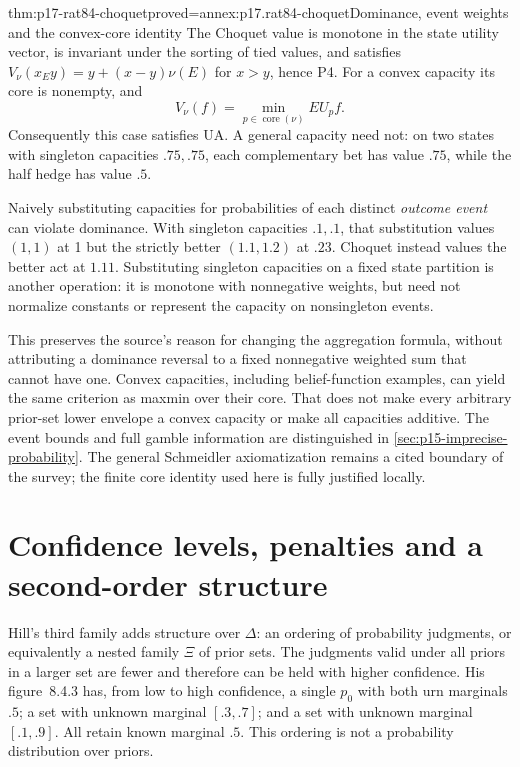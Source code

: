 \begin{hbtheorem}{thm:p17-rat84-choquet}{proved=annex:p17.rat84-choquet}{Dominance, event weights and the convex-core identity}
The Choquet value is monotone in the state utility vector, is invariant
under the sorting of tied values, and satisfies
\(V_\nu(x_Ey)=y+(x-y)\nu(E)\) for \(x>y\), hence P4.
For a convex capacity its core is nonempty, and
\[
              V_\nu(f)=\min_{p\in\operatorname{core}(\nu)}EU_p f.
\]
Consequently this case satisfies UA. A general capacity need not:
on two states with singleton capacities \(.75,.75\), each
complementary bet has value \(.75\), while the half hedge has
value \(.5\).

Naively substituting capacities for probabilities of each distinct
\emph{outcome event} can violate dominance. With singleton capacities
\(.1,.1\), that substitution values \((1,1)\) at 1 but the
strictly better \((1.1,1.2)\) at \(.23\). Choquet instead values
the better act at \(1.11\). Substituting singleton capacities on
a fixed state partition is another operation: it is monotone with
nonnegative weights, but need not normalize constants or represent
the capacity on nonsingleton events.
\end{hbtheorem}

This preserves the source's reason for changing the aggregation formula,
without attributing a dominance reversal to a fixed nonnegative weighted
sum that cannot have one. Convex capacities, including belief-function
examples, can yield the same criterion as maxmin over their core. That
does not make every arbitrary prior-set lower envelope a convex capacity
or make all capacities additive. The event bounds and full gamble
information are distinguished in \cref{sec:p15-imprecise-probability}.
The general Schmeidler axiomatization remains a cited boundary of the
survey; the finite core identity used here is fully justified locally.
\cite[Sec.~3, p.~500]{Hill2021DecisionUncertainty}

\section{Confidence levels, penalties and a second-order structure}
\label{sec:p17-rat84-confidence}

Hill's third family adds structure over \(\Delta\): an ordering of
probability judgments, or equivalently a nested family \(\Xi\) of
prior sets. The judgments valid under all priors in a larger set are
fewer and therefore can be held with higher confidence. His figure~8.4.3
has, from low to high confidence, a single \(p_0\) with both urn
marginals \(.5\); a set with unknown marginal \([.3,.7]\); and
a set with unknown marginal \([.1,.9]\). All retain known marginal
\(.5\). This ordering is not a probability distribution over priors.

